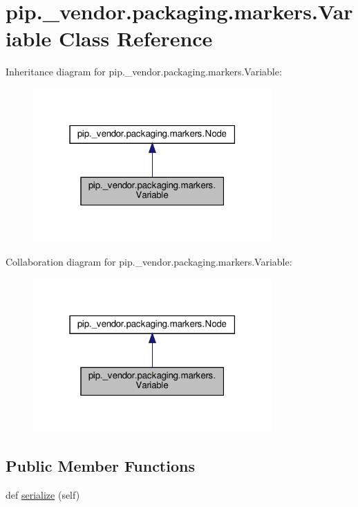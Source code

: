 \hypertarget{classpip_1_1__vendor_1_1packaging_1_1markers_1_1Variable}{}\section{pip.\+\_\+vendor.\+packaging.\+markers.\+Variable Class Reference}
\label{classpip_1_1__vendor_1_1packaging_1_1markers_1_1Variable}


Inheritance diagram for pip.\+\_\+vendor.\+packaging.\+markers.\+Variable\+:
\nopagebreak
\begin{figure}[H]
\begin{center}
\leavevmode
\includegraphics[width=259pt]{classpip_1_1__vendor_1_1packaging_1_1markers_1_1Variable__inherit__graph}
\end{center}
\end{figure}


Collaboration diagram for pip.\+\_\+vendor.\+packaging.\+markers.\+Variable\+:
\nopagebreak
\begin{figure}[H]
\begin{center}
\leavevmode
\includegraphics[width=259pt]{classpip_1_1__vendor_1_1packaging_1_1markers_1_1Variable__coll__graph}
\end{center}
\end{figure}
\subsection*{Public Member Functions}
\begin{DoxyCompactItemize}
\item 
def \hyperlink{classpip_1_1__vendor_1_1packaging_1_1markers_1_1Variable_a99f75fd157ee78c08d4728266c45d775}{serialize} (self)
\end{DoxyCompactItemize}
